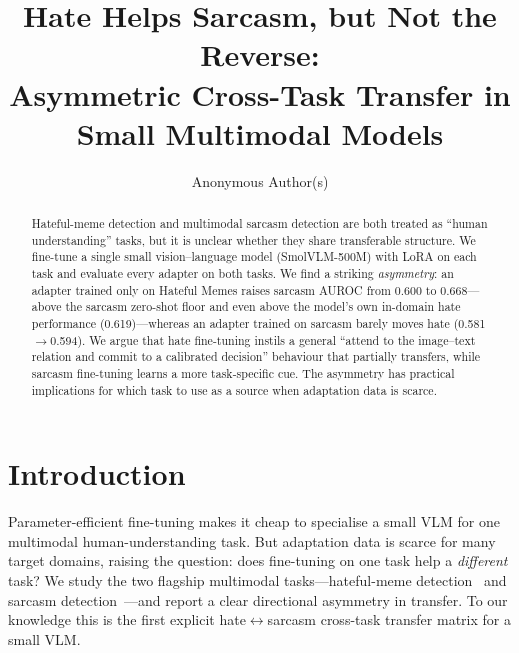 \documentclass[sigconf,nonacm]{acmart}
\begin{document}
\title{Hate Helps Sarcasm, but Not the Reverse:\\
Asymmetric Cross-Task Transfer in Small Multimodal Models}

\author{Anonymous Author(s)}

\begin{abstract}
Hateful-meme detection and multimodal sarcasm detection are both treated as ``human
understanding'' tasks, but it is unclear whether they share transferable structure. We
fine-tune a single small vision--language model (SmolVLM-500M) with LoRA on each task and
evaluate every adapter on both tasks. We find a striking \emph{asymmetry}: an adapter
trained only on Hateful Memes raises sarcasm AUROC from 0.600 to 0.668---above the
sarcasm zero-shot floor and even above the model's own in-domain hate performance
(0.619)---whereas an adapter trained on sarcasm barely moves hate (0.581$\to$0.594). We
argue that hate fine-tuning instils a general ``attend to the image--text relation and
commit to a calibrated decision'' behaviour that partially transfers, while sarcasm
fine-tuning learns a more task-specific cue. The asymmetry has practical implications for
which task to use as a source when adaptation data is scarce.
\end{abstract}


\maketitle

\section{Introduction}
Parameter-efficient fine-tuning makes it cheap to specialise a small VLM for one
multimodal human-understanding task. But adaptation data is scarce for many target
domains, raising the question: does fine-tuning on one task help a \emph{different} task?
We study the two flagship multimodal tasks---hateful-meme detection~\cite{kiela2020hateful}
and sarcasm detection~\cite{qin2023mmsd2}---and report a clear directional asymmetry in
transfer. To our knowledge this is the first explicit hate$\leftrightarrow$sarcasm
cross-task transfer matrix for a small VLM.
\end{document}
